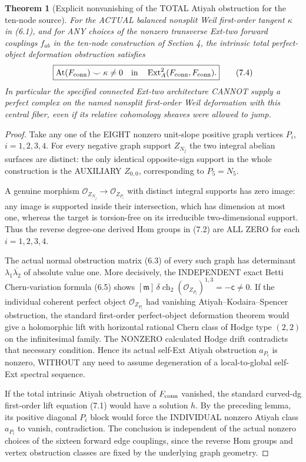 \documentclass[11pt,a4paper]{article}
\newcommand{\ch}{\operatorname{ch}}
\newtheorem{theorem}{Theorem}[section]
\begin{document}
\begin{theorem}[Explicit nonvanishing of the TOTAL Atiyah obstruction for the ten-node source]
For the ACTUAL balanced
nonsplit Weil first-order
tangent \(\kappa\) in (6.1),
and for ANY choices of
the nonzero transverse
Ext-two forward couplings
\(f_{ab}\) in the ten-node
construction of Section 4,
the intrinsic total
perfect-object deformation
obstruction satisfies
\[
 \boxed{
  \operatorname{At}(F_{\rm conn})
        \smile\kappa
       \ne0
 \quad\text{in}\quad
       \operatorname{Ext}^2_A
        (F_{\rm conn},F_{\rm conn}).}                \tag{7.4}
\]
In particular the specified
connected Ext-two architecture
CANNOT supply a perfect
complex on the named
nonsplit first-order
Weil deformation with
this central fiber, even
if its relative cohomology
sheaves were allowed
to jump.
\end{theorem}
\begin{proof}
Take any one of the EIGHT
nonzero unit-slope
positive graph vertices
\(P_i\), \(i=1,2,3,4\).
For every negative
graph support \(Z_{N_j}\)
the two integral
abelian surfaces are
distinct: the only
identical opposite-sign
support in the whole
construction is the
AUXILIARY \(Z_{0,0}\),
corresponding to
\(P_5=N_5\).

A genuine morphism
\(
 \mathcal O_{Z_{N_j}}
      \to\mathcal O_{Z_{P_i}}
\)
with distinct integral
supports has zero image:
any image is supported
inside their intersection,
which has dimension at
most one, whereas the
target is torsion-free
on its irreducible
two-dimensional support.
Thus the reverse
degree-one derived Hom
groups in (7.2) are
ALL ZERO for each
\(i=1,2,3,4\).

The actual normal
obstruction matrix (6.3)
of every such graph
has determinant
\(\lambda_1\overline{\lambda_2}\)
of absolute value one.
More decisively, the
INDEPENDENT exact Betti
Chern-variation formula
(6.5) shows
\(
 [\mathfrak m]\,
  \delta\ch_2(\mathcal O_{Z_{P_i}})^{1,3}
  =-\mathsf c\ne0.
\)
If the individual
coherent perfect object
\(\mathcal O_{Z_{P_i}}\)
had vanishing
Atiyah--Kodaira--Spencer
obstruction, the standard
first-order perfect-object
deformation theorem would
give a holomorphic lift
with horizontal rational
Chern class of Hodge type
\((2,2)\) on the
infinitesimal family.
The NONZERO calculated
Hodge drift contradicts
that necessary condition.
Hence its actual self-Ext
Atiyah obstruction
\(a_{P_i}\) is nonzero,
WITHOUT any need to
assume degeneration of
a local-to-global
self-Ext spectral sequence.

If the total intrinsic
Atiyah obstruction of
\(F_{\rm conn}\) vanished,
the standard curved-dg
first-order lift equation
(7.1) would have a
solution \(h\).
By the preceding lemma,
its positive diagonal
\(P_i\) block would force
the INDIVIDUAL
nonzero Atiyah class
\(a_{P_i}\) to vanish,
contradiction.
The conclusion is
independent of the
actual nonzero choices
of the sixteen forward
edge couplings, since
the reverse Hom groups
and vertex obstruction
classes are fixed by
the underlying graph
geometry.
\end{proof}
\end{document}
